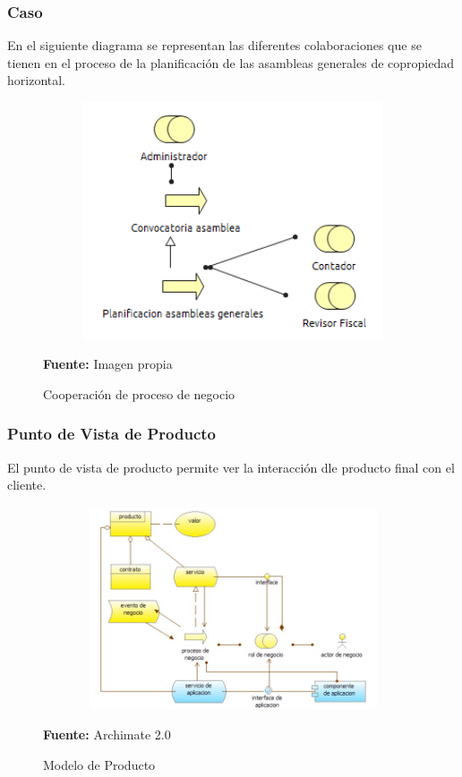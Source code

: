 \subsubsection{Caso}

En el siguiente diagrama se representan las diferentes colaboraciones que se tienen en el proceso de la planificación de las asambleas generales de copropiedad horizontal.

\begin{figure}[th!]
	\centering
	\includegraphics[width=12cm,height=7cm]{arquitectura/negocio/imgs/cooperacion-proceso}
	\caption{Cooperación de proceso de negocio}{\scriptsize \textbf{Fuente:} Imagen propia}
\end{figure}
\newpage

\subsubsection{Punto de Vista de Producto}

El punto de vista de producto permite ver la interacción dle producto final con el cliente.


\begin{figure}[th!]
	\centering
	\includegraphics[width=12cm,height=6cm]{arquitectura/negocio/imgs/producto.jpg}
	\caption{Modelo de Producto}{\scriptsize \textbf{Fuente:} Archimate 2.0 \cite{WEB7}}
\end{figure}

